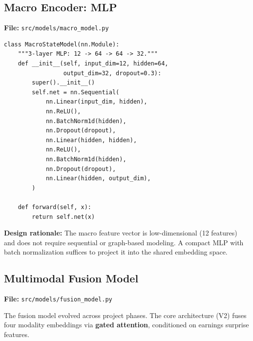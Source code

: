 \documentclass[12pt, a4paper]{article}
\begin{document}
\subsection{Macro Encoder: MLP}
\label{sec:macro-model}

\noindent\textbf{File:} \texttt{src/models/macro\_model.py}

\begin{lstlisting}[caption={Macro state encoder}]
class MacroStateModel(nn.Module):
    """3-layer MLP: 12 -> 64 -> 64 -> 32."""
    def __init__(self, input_dim=12, hidden=64,
                 output_dim=32, dropout=0.3):
        super().__init__()
        self.net = nn.Sequential(
            nn.Linear(input_dim, hidden),
            nn.ReLU(),
            nn.BatchNorm1d(hidden),
            nn.Dropout(dropout),
            nn.Linear(hidden, hidden),
            nn.ReLU(),
            nn.BatchNorm1d(hidden),
            nn.Dropout(dropout),
            nn.Linear(hidden, output_dim),
        )
    
    def forward(self, x):
        return self.net(x)
\end{lstlisting}

\textbf{Design rationale:}  The macro feature vector is low-dimensional (12 features) and does not require sequential or graph-based modeling.  A compact MLP with batch normalization suffices to project it into the shared embedding space.


\subsection{Multimodal Fusion Model}
\label{sec:fusion-model}

\noindent\textbf{File:} \texttt{src/models/fusion\_model.py}

The fusion model evolved across project phases.  The core architecture (V2) fuses four modality embeddings via \textbf{gated attention}, conditioned on earnings surprise features.
\end{document}
